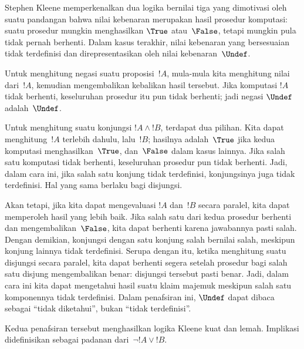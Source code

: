\documentclass[../../../include/open-logic-section]{subfiles}
\begin{document}


Stephen Kleene memperkenalkan dua logika bernilai tiga yang dimotivasi oleh
suatu pandangan bahwa nilai kebenaran merupakan hasil prosedur komputasi:
suatu prosedur mungkin menghasilkan $\True$ atau~$\False$, tetapi mungkin pula
tidak pernah berhenti. Dalam kasus terakhir, nilai kebenaran yang bersesuaian
tidak terdefinisi dan direpresentasikan oleh nilai kebenaran~$\Undef$.

Untuk menghitung negasi suatu proposisi~$!A$, mula-mula kita menghitung nilai
dari~$!A$, kemudian mengembalikan kebalikan hasil tersebut. Jika komputasi
$!A$ tidak berhenti, keseluruhan prosedur itu pun tidak berhenti; jadi negasi
$\Undef$ adalah~$\Undef$.

Untuk menghitung suatu konjungsi $!A\land !B$, terdapat dua pilihan. Kita dapat
menghitung~$!A$ terlebih dahulu, lalu~$!B$; hasilnya adalah~$\True$ jika kedua
komputasi menghasilkan~$\True$, dan~$\False$ dalam kasus lainnya. Jika salah
satu komputasi tidak berhenti, keseluruhan prosedur pun tidak berhenti. Jadi,
dalam cara ini, jika salah satu konjung tidak terdefinisi, konjungsinya juga
tidak terdefinisi. Hal yang sama berlaku bagi disjungsi.

Akan tetapi, jika kita dapat mengevaluasi $!A$ dan~$!B$ secara paralel, kita
dapat memperoleh hasil yang lebih baik. Jika salah satu dari kedua prosedur
berhenti dan mengembalikan~$\False$, kita dapat berhenti karena jawabannya
pasti salah. Dengan demikian, konjungsi dengan satu konjung salah bernilai
salah, meskipun konjung lainnya tidak terdefinisi. Serupa dengan itu, ketika
menghitung suatu disjungsi secara paralel, kita dapat berhenti segera setelah
prosedur bagi salah satu disjung mengembalikan benar: disjungsi tersebut pasti
benar. Jadi, dalam cara ini kita dapat mengetahui hasil suatu klaim majemuk
meskipun salah satu komponennya tidak terdefinisi. Dalam penafsiran ini,
$\Undef$ dapat dibaca sebagai ``tidak diketahui'', bukan ``tidak
terdefinisi''.

Kedua penafsiran tersebut menghasilkan logika Kleene kuat dan lemah.
Implikasi didefinisikan sebagai padanan dari~$\lnot !A\lor !B$.
\end{document}
